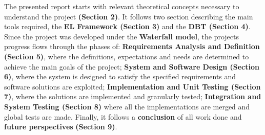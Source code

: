 
The presented report starts with relevant theoretical concepts necessary to understand the project \textbf{(Section 2)}. It follows two section describing the main tools required, the \textbf{EL Framework (Section 3)} and the \textbf{DBT (Section 4)}. Since the project was developed under the \textbf{Waterfall model}, the projects progress flows through the phases of: \textbf{Requirements Analysis and Definition (Section 5)}, where the definitions, expectations and needs are determined to achieve the main goals of the project; \textbf{System and Software Design (Section 6)}, where the system is designed to satisfy the specified requirements and software solutions are exploited; \textbf{Implementation and Unit Testing (Section 7)}, where the solutions are implemented and granularly tested; \textbf{Integration and System Testing (Section 8)} where all the implementations are merged and global tests are made.
Finally, it follows a \textbf{conclusion} of all work done and \textbf{future perspectives} \textbf{(Section 9)}.


